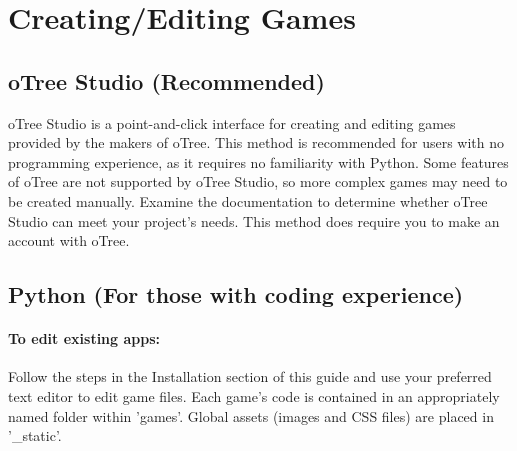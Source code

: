 \documentclass{article}
\begin{document}
  		
	\section{Creating/Editing Games}
		\subsection{oTree Studio (Recommended)}
			oTree Studio is a point-and-click interface for creating and editing games provided by the makers of oTree. This method is recommended for users with no programming experience, as it requires no familiarity with Python. Some features of oTree are not supported by oTree Studio, so more complex games may need to be created manually. Examine the documentation to determine whether oTree Studio can meet your project's needs. This method does require you to make an account with oTree.
		
		\subsection{Python (For those with coding experience)}
			\paragraph{To edit existing apps:} Follow the steps in the Installation section of this guide and use your preferred text editor to edit game files. Each game's code is contained in an appropriately named folder within 'games'. Global assets (images and CSS files) are placed in '\_static'.
\end{document}
